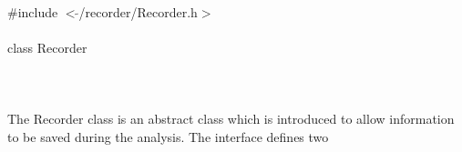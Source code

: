
   \\
\indent \#include $<\tilde{ }$/recorder/Recorder.h$>$  \\

  \\
\indent class Recorder \\

 \\
 \\

  \\
\indent The Recorder class is an abstract class which is introduced to allow
information to be saved during the analysis. The interface defines two
